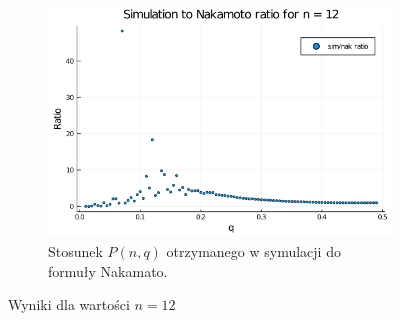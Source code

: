 \documentclass{article}
\begin{document}
\begin{figure}[H]
            \begin{subfigure}{0.65\textwidth}
                \includegraphics[width=\linewidth]{img/mc_to_na_n=12.png}
                \caption{Stosunek $P(n,q)$ otrzymanego w symulacji do formuły Nakamato.}
            \end{subfigure}
    
            \caption{Wyniki dla wartości $n = 12$}
        \end{figure}
\end{document}
